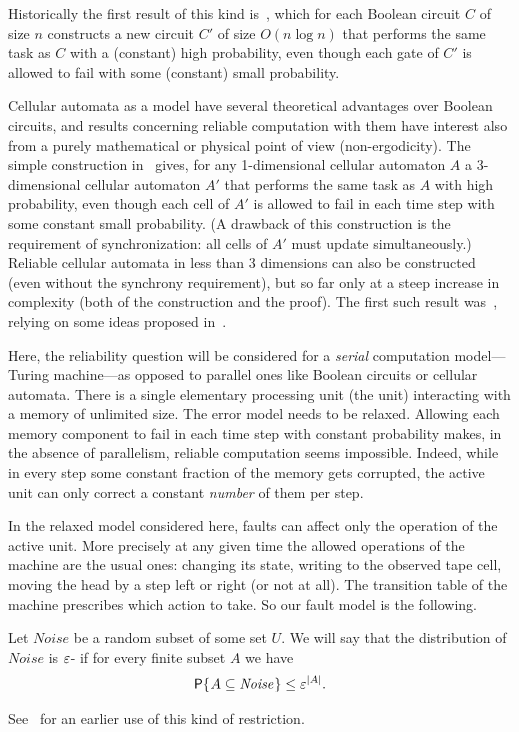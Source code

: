 \documentclass[11pt]{memoir}
\theoremstyle{definition} %
\renewcommand{\le}{\leq}
\newcommand{\Noise}{\mathit{Noise}}
\begin{document}
Historically the first result of this kind is~\cite{VonNeum56}, which for each Boolean
circuit \( C \) of size \( n \) constructs a new circuit \( C' \)
of size \( O(n\log n) \) that performs the same task as \( C \) with a (constant)
high probability, even though each gate of
\( C' \) is allowed to fail with some (constant) small probability.

Cellular automata as a model have several theoretical advantages over Boolean circuits, and results concerning
reliable computation with them have interest also from a purely mathematical or 
physical point of view (non-ergodicity).
The simple construction in~\cite{GacsReif3dim88} gives, for any 1-dimensional
cellular automaton \( A \) a 3-dimensional cellular automaton \( A' \) 
that performs the same task as \( A \) with high probability, even though each cell of
\( A' \) is allowed to fail in each time step with some constant small probability.
(A drawback of this construction is the requirement of synchronization: all cells of \( A' \) must
update simultaneously.)
Reliable cellular automata in less than 3 dimensions can also be constructed (even
without the synchrony requirement), but so far only at a
steep increase in complexity (both of the construction and the proof).
The first such result was~\cite{Gacs1dim86}, relying on some ideas proposed in~\cite{Kurd78}.

Here, the reliability question will be considered for a \emph{serial}
computation model---Turing machine---as opposed to parallel ones like
Boolean circuits or cellular automata.
There is a single elementary processing unit (the  unit)
interacting with a memory of unlimited size.
The error model needs to be relaxed.
Allowing each memory component to fail in each time step with constant probability
makes, in the absence of parallelism, reliable computation seems impossible.
Indeed, while in every step some constant fraction of the memory gets corrupted,
the active unit can only correct a constant \emph{number} of them per step.

In the relaxed model considered here, faults can affect only the operation of the active unit.
More precisely at any given time the allowed operations of the machine are the usual ones:
changing its state, writing to the observed tape cell, moving the head by a step left or right (or not at all).
The transition table of the machine prescribes which action to take.
So our fault model is the following.

\begin{definition}
  Let \( \Noise \) be a random subset of some set \( U \).
  We will say that the distribution of \( \Noise \) is \( \varepsilon \)- if for every finite subset \( A \)
  we have
  \begin{align*}
   \Pbof{A\subseteq\Noise} \le \eps^{|A|}.
  \end{align*}
\end{definition}
See~\cite{Toom80} for an earlier use of this kind of restriction.
\end{document}
